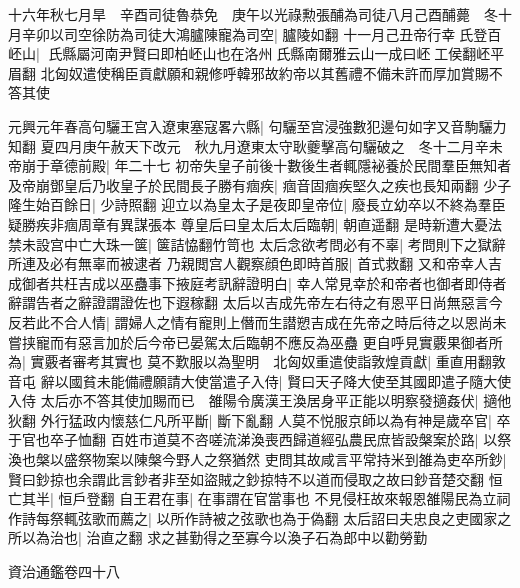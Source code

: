 十六年秋七月旱　辛酉司徒魯恭免　庚午以光祿勲張酺為司徒八月己酉酺薨　冬十月辛卯以司空徐防為司徒大鴻臚陳寵為司空|{
	臚陵如翻}
十一月己丑帝行幸氏登百岯山|{
	氏縣屬河南尹賢曰即柏岯山也在洛州氏縣南爾雅云山一成曰岯工侯翻岯平眉翻}
北匈奴遣使稱臣貢獻願和親修呼韓邪故約帝以其舊禮不備未許而厚加賞賜不答其使

元興元年春高句驪王宫入遼東塞寇畧六縣|{
	句驪至宫浸強數犯邊句如字又音駒驪力知翻}
夏四月庚午赦天下改元　秋九月遼東太守耿夔擊高句驪破之　冬十二月辛未帝崩于章德前殿|{
	年二十七}
初帝失皇子前後十數後生者輒隱袐養於民間羣臣無知者及帝崩鄧皇后乃收皇子於民間長子勝有痼疾|{
	痼音固痼疾堅久之疾也長知兩翻}
少子隆生始百餘日|{
	少詩照翻}
迎立以為皇太子是夜即皇帝位|{
	廢長立幼卒以不終為羣臣疑勝疾非痼周章有異謀張本}
尊皇后曰皇太后太后臨朝|{
	朝直遥翻}
是時新遭大憂法禁未設宫中亡大珠一箧|{
	箧詰恊翻竹笥也}
太后念欲考問必有不辜|{
	考問則下之獄辭所連及必有無辜而被逮者}
乃親閲宫人觀察顔色即時首服|{
	首式救翻}
又和帝幸人吉成御者共枉吉成以巫蠱事下掖庭考訊辭證明白|{
	幸人常見幸於和帝者也御者即侍者辭謂告者之辭證謂證佐也下遐稼翻}
太后以吉成先帝左右待之有恩平日尚無惡言今反若此不合人情|{
	謂婦人之情有寵則上僭而生譛愬吉成在先帝之時后待之以恩尚未嘗挟寵而有惡言加於后今帝已晏駕太后臨朝不應反為巫蠱}
更自呼見實覈果御者所為|{
	實覈者審考其實也}
莫不歎服以為聖明　北匈奴重遣使詣敦煌貢獻|{
	重直用翻敦音屯}
辭以國貧未能備禮願請大使當遣子入侍|{
	賢曰天子降大使至其國即遣子隨大使入侍}
太后亦不答其使加賜而已　雒陽令廣漢王渙居身平正能以明察發擿姦伏|{
	擿他狄翻}
外行猛政内懷慈仁凡所平斷|{
	斷下亂翻}
人莫不悦服京師以為有神是歲卒官|{
	卒于官也卒子恤翻}
百姓市道莫不咨嗟流涕渙喪西歸道經弘農民庶皆設槃案於路|{
	以祭渙也槃以盛祭物案以陳槃今野人之祭猶然}
吏問其故咸言平常持米到雒為吏卒所鈔|{
	賢曰鈔掠也余謂此言鈔者非至如盜賊之鈔掠特不以道而侵取之故曰鈔音楚交翻}
恒亡其半|{
	恒戶登翻}
自王君在事|{
	在事謂在官當事也}
不見侵枉故來報恩雒陽民為立祠作詩每祭輒弦歌而薦之|{
	以所作詩被之弦歌也為于偽翻}
太后詔曰夫忠良之吏國家之所以為治也|{
	治直之翻}
求之甚勤得之至寡今以渙子石為郎中以勸勞勤

資治通鑑卷四十八
